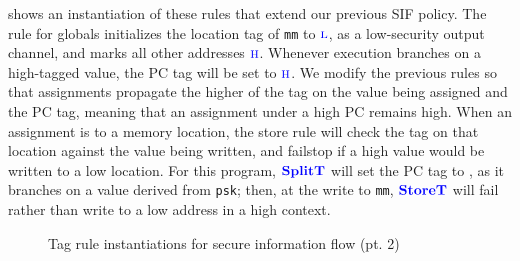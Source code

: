 \documentclass{llncs}
\begin{document}
 shows an instantiation of these rules that extend our previous SIF policy.
The rule for globals initializes the location tag of {\tt mm} to \(\textnormal{\color{blue} \sc l}\),
as a low-security output channel, and marks all other addresses \(\textnormal{\color{blue} \sc h}\). Whenever execution branches on
a high-tagged value, the PC tag will be set to \(\textnormal{\color{blue} \sc h}\). We modify the previous rules so that
assignments propagate the higher of the tag on the value being assigned and the PC tag, meaning that an
assignment under a high PC remains high.
When an assignment is to a memory location, the store rule will check the tag on
that location against the value being written, 
and failstop if a high value would be written to a low location.
For this program, \(\color{blue} \mathbf{SplitT}\) will set the PC tag to \high, as it branches on a value derived from {\tt psk}; 
then, at the write to {\tt mm}, \(\color{blue} \mathbf{StoreT}\) will fail rather than write to a low address
in a high context.

\begin{figure}[t]
\caption{Tag rule instantiations for secure information flow (pt. 2)}
\label{fig:example2rules}
\end{figure}
\end{document}
